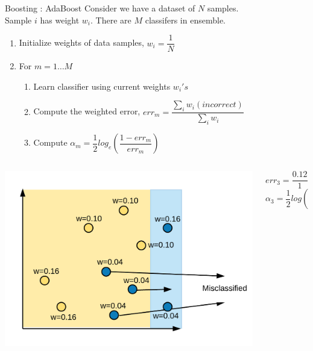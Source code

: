 \documentclass{beamer}
\begin{document}
\begin{frame}{Boosting : AdaBoost }
  Consider we have a dataset of $N$ samples.\\
  Sample $i$ has weight $w_i$. There are $M$ classifers in ensemble.\\
  \begin{enumerate}
    \item Initialize weights of data samples, $w_i = \dfrac{1}{N}$
    \item For $m = 1\dots M$
          \begin{enumerate}
            \item Learn classifier using current weights $w_i's$
            \item Compute the weighted error, $err_m = \dfrac{\sum\limits_iw_i(incorrect)}{\sum\limits_iw_i}$
            \item Compute $\alpha_m = \dfrac{1}{2}log_e\left(\dfrac{1 - err_m}{err_m}\right)$
          \end{enumerate}
  \end{enumerate}
  \begin{columns}
    \begin{column}{0.5\textwidth}
      \centering
      \includegraphics[width = \textwidth]{../assets/ensemble/diagrams/ada_iter3_misclassify}
    \end{column}
    \begin{column}{0.5\textwidth}
      $err_3 = \dfrac{0.12}{1}$\\
      $\alpha_3 = \dfrac{1}{2}log\left(\dfrac{1-0.12}{0.12}\right) = 0.99$
    \end{column}
  \end{columns}
\end{frame}
\end{document}
